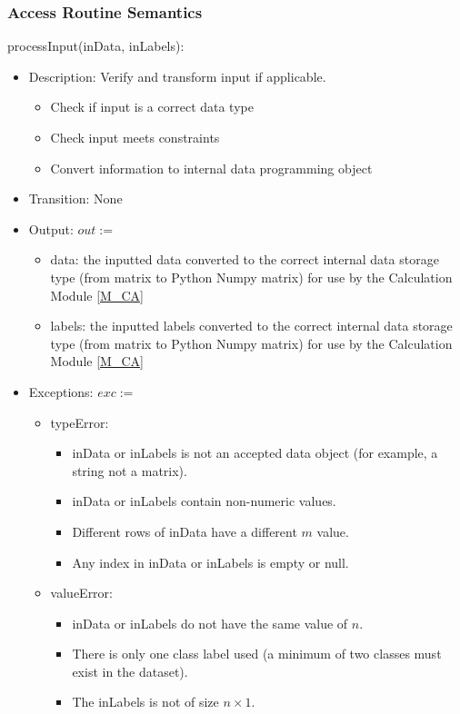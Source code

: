 \documentclass[12pt, titlepage]{article}
\begin{document}
\subsubsection{Access Routine Semantics}

\noindent processInput(inData, inLabels):
\begin{itemize}
\item Description: Verify and transform input if applicable.
\begin{itemize}
\item Check if input is a correct data type
\item Check input meets constraints
\item Convert information to internal data programming object
\end{itemize}
\item Transition: None
\item Output: $out:=$
\begin{itemize}
\item data: the inputted data converted to the correct internal data storage type (from matrix to Python Numpy matrix) for use by the Calculation Module \ref{M_CA}
\item labels: the inputted labels converted to the correct internal data storage type (from matrix to Python Numpy matrix) for use by the Calculation Module \ref{M_CA}
\end{itemize}
\item Exceptions: $exc:=$
    \begin{itemize}
    \item typeError: 
    \begin{itemize}
    \item inData or inLabels is not an accepted data object (for example, a string not a matrix).
    \item inData or inLabels contain non-numeric values.
    \item Different rows of inData have a different $m$ value.
    \item Any index in inData or inLabels is empty or null.
    \end{itemize}
    \item valueError:
        \begin{itemize}
        \item inData or inLabels do not have the same value of $n$.
        \item There is only one class label used (a minimum of two classes must exist in the dataset).
        \item The inLabels is not of size $n \times 1$.
        \end{itemize}
\end{itemize}
\end{itemize}
\end{document}
